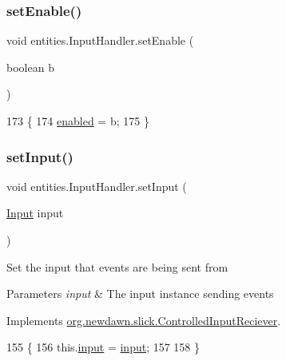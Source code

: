 \subsubsection{\texorpdfstring{set\+Enable()}{setEnable()}}
{\footnotesize\ttfamily void entities.\+Input\+Handler.\+set\+Enable (\begin{DoxyParamCaption}\item[{boolean}]{b }\end{DoxyParamCaption})\hspace{0.3cm}{\ttfamily [inline]}}


\begin{DoxyCode}
173                                      \{
174         \mbox{\hyperlink{classentities_1_1_input_handler_a438eff19a77640d2055a83c332aff302}{enabled}} = b;
175     \}
\end{DoxyCode}
\mbox{\label{classentities_1_1_input_handler_ad3a1eb35970a169a68b3c01246562a3e}} 
\subsubsection{\texorpdfstring{set\+Input()}{setInput()}}
{\footnotesize\ttfamily void entities.\+Input\+Handler.\+set\+Input (\begin{DoxyParamCaption}\item[{\mbox{\hyperlink{classorg_1_1newdawn_1_1slick_1_1_input}{Input}}}]{input }\end{DoxyParamCaption})\hspace{0.3cm}{\ttfamily [inline]}}

Set the input that events are being sent from


\begin{DoxyParams}{Parameters}
{\em input} & The input instance sending events \\
\hline
\end{DoxyParams}


Implements \mbox{\hyperlink{interfaceorg_1_1newdawn_1_1slick_1_1_controlled_input_reciever_ab838ca221a429b05c0b53aea9b4fe72f}{org.\+newdawn.\+slick.\+Controlled\+Input\+Reciever}}.


\begin{DoxyCode}
155                                       \{
156         this.\mbox{\hyperlink{classentities_1_1_input_handler_a924ff1658e32e10d77694adf4856b26f}{input}} = \mbox{\hyperlink{classentities_1_1_input_handler_a924ff1658e32e10d77694adf4856b26f}{input}};
157 
158     \}
\end{DoxyCode}


